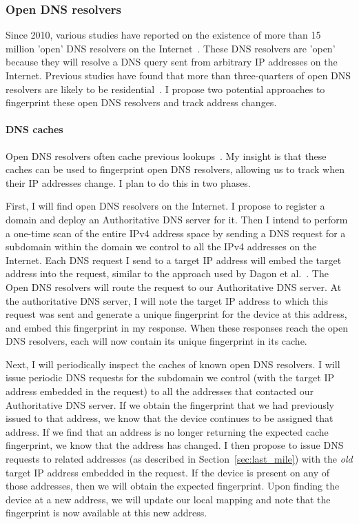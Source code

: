 \subsubsection{Open DNS resolvers}

Since 2010, various studies have reported on the existence of more
than 15 million 'open' DNS resolvers on the
Internet~\cite{openresolver, schomp2014clientsidedns, kuhrer2014exit,
  kuhrer2015going}. These DNS resolvers are 'open' because they will resolve a DNS query sent from arbitrary IP
addresses on the Internet. Previous studies have found that more than
three-quarters of open DNS resolvers are likely to be
residential~\cite{schomp2014dnsvul, schomp2014clientsidedns}. I
propose two potential approaches to fingerprint these open DNS
resolvers and track address changes.

\paragraph{DNS caches}
Open DNS resolvers often cache previous
lookups~\cite{schomp2014dnsvul}. My insight is that these caches can
be used to fingerprint open DNS resolvers, allowing us to track when
their IP addresses change. I plan to do this in two phases.

First, I will find open DNS resolvers on the Internet. I propose to register a domain and deploy an Authoritative DNS server
for it. Then I intend to perform a one-time scan of the entire IPv4
address space by sending a DNS request for a subdomain within the
domain we control to all the IPv4 addresses on the Internet. Each DNS
request I send to a target IP address will embed the target address
into the request, similar to the approach used by Dagon et
al.~\cite{dagon2008corrupted}. The Open DNS resolvers will route the
request to our Authoritative DNS server.  At the authoritative DNS
server, I will note the target IP address to which this request was
sent and generate a unique fingerprint for the device at this address,
and embed this fingerprint in my response. When these responses
reach the open DNS resolvers, each will now contain its unique
fingerprint in its cache.

Next, I will periodically inspect the caches of known open DNS resolvers.
I will issue periodic DNS requests for the subdomain we
control (with the target IP address embedded in the request) to all
the addresses that contacted our Authoritative DNS server. If we
obtain the fingerprint that we had previously issued to that address,
we know that the device continues to be assigned that address. If we
find that an address is no longer returning the expected cache
fingerprint, we know that the address has changed. I then propose to
issue DNS requests to related addresses (as described in
Section~\ref{sec:last_mile}) with the \emph{old} target IP address
embedded in the request. If the device is present on any of those
addresses, then we will obtain the expected fingerprint. Upon finding
the device at a new address, we will update
our local mapping and note that the fingerprint is now available at
this new address.

